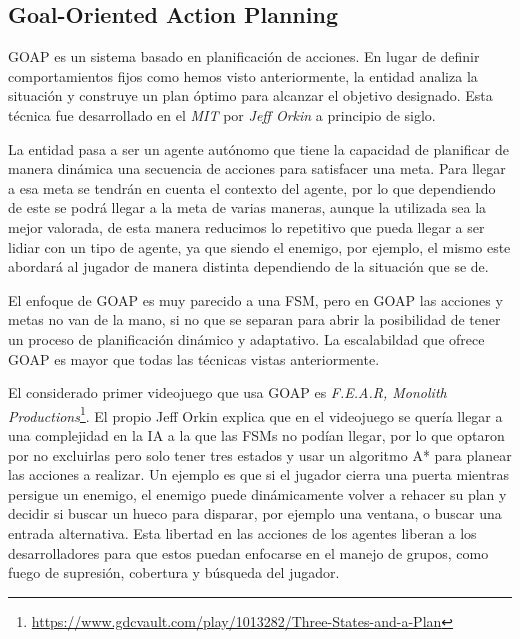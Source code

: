 \subsection{Goal-Oriented Action Planning}

GOAP es un sistema basado en planificación de acciones. En lugar de definir comportamientos fijos como hemos visto anteriormente, la entidad analiza la situación y construye un plan óptimo para alcanzar el objetivo designado.
Esta técnica fue desarrollado en el \textit{MIT} por \textit{Jeff Orkin} a principio de siglo. 

La entidad pasa a ser un agente autónomo que tiene la capacidad de planificar de manera dinámica una secuencia de acciones para satisfacer una meta. Para llegar a esa meta se tendrán en cuenta el contexto del agente, por lo que dependiendo de este se podrá llegar a la meta de varias maneras, aunque la utilizada sea la mejor valorada, de esta manera reducimos lo repetitivo que pueda llegar a ser lidiar con un tipo de agente, ya que siendo el enemigo, por ejemplo, el mismo este abordará al jugador de manera distinta dependiendo de la situación que se de.

El enfoque de GOAP es muy parecido a una FSM, pero en GOAP las acciones y metas no van de la mano, si no que se separan para abrir la posibilidad de tener un proceso de planificación dinámico y adaptativo.
La escalabildad  que ofrece GOAP es mayor que todas las técnicas vistas anteriormente.

El considerado primer videojuego que usa GOAP es \textit{F.E.A.R, Monolith Productions}\footnote{\url{https://www.gdcvault.com/play/1013282/Three-States-and-a-Plan}}. El propio Jeff Orkin explica que en el videojuego se quería llegar a una complejidad en la IA a la que las FSMs no podían llegar, por lo que optaron por no excluirlas pero solo tener tres estados y usar un algoritmo A* para planear las acciones a realizar. Un ejemplo es que si el jugador cierra una puerta mientras persigue un enemigo, el enemigo puede dinámicamente volver a rehacer su plan y decidir si buscar un hueco para disparar, por ejemplo una ventana, o buscar una entrada alternativa. Esta libertad en las acciones de los agentes liberan a los desarrolladores para que estos puedan enfocarse en el manejo de grupos, como fuego de supresión, cobertura y búsqueda del jugador.

